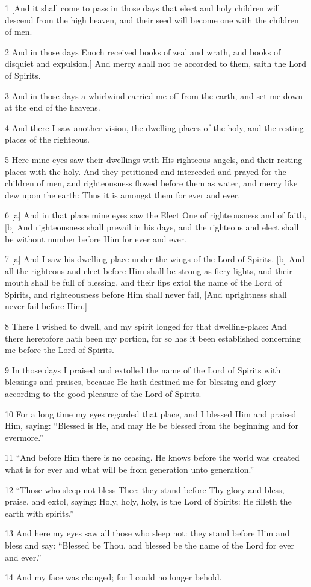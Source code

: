 \par 1 [And it shall come to pass in those days that elect and holy children will descend from the high heaven, and their seed will become one with the children of men.
\par 2 And in those days Enoch received books of zeal and wrath, and books of disquiet and expulsion.] And mercy shall not be accorded to them, saith the Lord of Spirits.
\par 3 And in those days a whirlwind carried me off from the earth, and set me down at the end of the heavens.
\par 4 And there I saw another vision, the dwelling-places of the holy, and the resting-places of the righteous.
\par 5 Here mine eyes saw their dwellings with His righteous angels, and their resting-places with the holy. And they petitioned and interceded and prayed for the children of men, and righteousness flowed before them as water, and mercy like dew upon the earth: Thus it is amongst them for ever and ever.
\par 6 [a] And in that place mine eyes saw the Elect One of righteousness and of faith, [b] And righteousness shall prevail in his days, and the righteous and elect shall be without number before Him for ever and ever.
\par 7 [a] And I saw his dwelling-place under the wings of the Lord of Spirits. [b] And all the righteous and elect before Him shall be strong as fiery lights, and their mouth shall be full of blessing, and their lips extol the name of the Lord of Spirits, and righteousness before Him shall never fail, [And uprightness shall never fail before Him.]
\par 8 There I wished to dwell, and my spirit longed for that dwelling-place: And there heretofore hath been my portion, for so has it been established concerning me before the Lord of Spirits.
\par 9 In those days I praised and extolled the name of the Lord of Spirits with blessings and praises, because He hath destined me for blessing and glory according to the good pleasure of the Lord of Spirits.
\par 10 For a long time my eyes regarded that place, and I blessed Him and praised Him, saying: “Blessed is He, and may He be blessed from the beginning and for evermore.”
\par 11 “And before Him there is no ceasing. He knows before the world was created what is for ever and what will be from generation unto generation.”
\par 12 “Those who sleep not bless Thee: they stand before Thy glory and bless, praise, and extol, saying: Holy, holy, holy, is the Lord of Spirits: He filleth the earth with spirits.”
\par 13 And here my eyes saw all those who sleep not: they stand before Him and bless and say: “Blessed be Thou, and blessed be the name of the Lord for ever and ever.”
\par 14 And my face was changed; for I could no longer behold.

